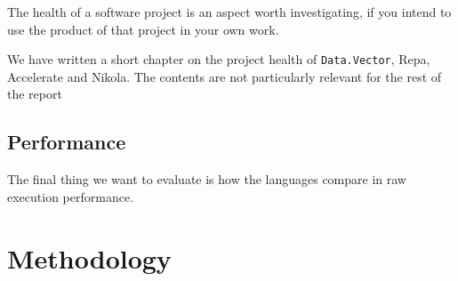 The health of a software project is an aspect worth investigating, if
you intend to use the product of that project in your own work. 

We have written a short chapter on the project health of
\texttt{Data.Vector}, Repa, Accelerate and Nikola. The contents are
not particularly relevant for the rest of the report 

\subsection{Performance} The final thing we want to evaluate is how
the languages compare in raw execution performance.


\section{Methodology}




